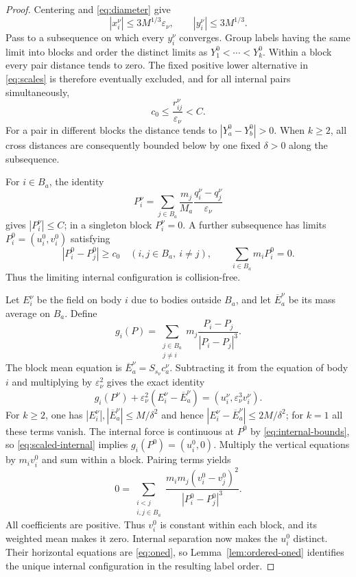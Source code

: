 \documentclass[11pt,a4paper]{amsart}
\numberwithin{equation}{section}
\newcommand{\eps}{\varepsilon}
\begin{document}
\begin{proof}
Centering and \eqref{eq:diameter} give
\[
 |x_i^\nu|\le3M^{1/3}\eps_\nu,\qquad
 |y_i^\nu|\le3M^{1/3}.
\]
Pass to a subsequence on which every $y_i^\nu$ converges. Group labels
having the same limit into blocks and order the distinct limits as
$Y_1^0<\cdots<Y_k^0$. Within a block every pair distance tends to zero.
The fixed positive lower alternative in \eqref{eq:scales} is therefore
eventually excluded, and for all internal pairs simultaneously,
\begin{equation}\label{eq:internal-bounds}
 c_0\le\frac{r_{ij}^\nu}{\eps_\nu}<C.
\end{equation}
For a pair in different blocks the distance tends to
$|Y_a^0-Y_b^0|>0$. When $k\ge2$, all cross distances are consequently
bounded below by one fixed $\delta>0$ along the subsequence.

For $i\in B_a$, the identity
\[
 P_i^\nu=\sum_{j\in B_a}\frac{m_j}{M_a}
                 \frac{q_i^\nu-q_j^\nu}{\eps_\nu}
\]
gives $|P_i^\nu|\le C$; in a singleton block $P_i^\nu=0$.
A further subsequence has limits $P_i^0=(u_i^0,v_i^0)$ satisfying
\[
 |P_i^0-P_j^0|\ge c_0\quad(i,j\in B_a,\ i\ne j),\qquad
 \sum_{i\in B_a}m_iP_i^0=0.
\]
Thus the limiting internal configuration is collision-free.

Let $E_i^\nu$ be the field on body $i$ due to bodies outside $B_a$,
and let $\overline E_a^\nu$ be its mass average on $B_a$. Define
\[
 g_i(P)=\sum_{\substack{j\in B_a\\j\ne i}}
                     m_j\frac{P_i-P_j}{|P_i-P_j|^3}.
\]
The block mean equation is
$\overline E_a^\nu=S_{s_\nu}c_a^\nu$. Subtracting it from the equation
of body $i$ and multiplying by $\eps_\nu^2$ gives the exact identity
\begin{equation}\label{eq:scaled-internal}
 g_i(P^\nu)+\eps_\nu^2(E_i^\nu-\overline E_a^\nu)
              =(u_i^\nu,\eps_\nu^3v_i^\nu).
\end{equation}
For $k\ge2$, one has $|E_i^\nu|,|\overline E_a^\nu|\le M/\delta^2$
and hence $|E_i^\nu-\overline E_a^\nu|\le2M/\delta^2$; for $k=1$
all these terms vanish. The internal force is continuous at $P^0$
by \eqref{eq:internal-bounds}, so \eqref{eq:scaled-internal} implies
$g_i(P^0)=(u_i^0,0)$. Multiply the vertical equations by $m_iv_i^0$
and sum within a block. Pairing terms yields
\begin{equation}\label{eq:vertical-pairing}
 0=\sum_{\substack{i<j\\i,j\in B_a}}
        \frac{m_im_j(v_i^0-v_j^0)^2}{|P_i^0-P_j^0|^3}.
\end{equation}
All coefficients are positive. Thus $v_i^0$ is constant within each
block, and its weighted mean makes it zero. Internal separation now
makes the $u_i^0$ distinct. Their horizontal equations are
\eqref{eq:oned}, so Lemma~\ref{lem:ordered-oned} identifies the unique
internal configuration in the resulting label order.


\end{proof}
\end{document}
